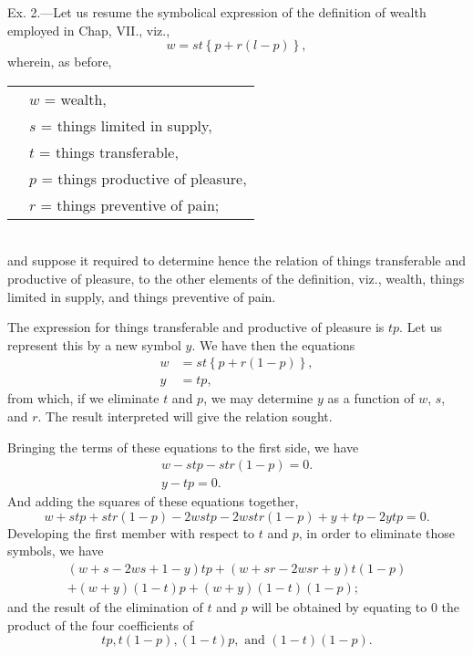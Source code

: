 \documentclass[oneside]{book}
\begin{document}
Ex. 2.---Let us resume the symbolical expression of the definition
of wealth employed in Chap, VII., viz.,
\[
w = st \left\{p + r\left(l - p\right)\right\},
\]
wherein, as before, \\
\begin{tabular}{c l}
&$w$ = \textrm{wealth,}\\
&$s$ = \textrm{things limited in supply,}\\
&$t$ = \textrm{things transferable,}\\
&$p$ = \textrm{things productive of pleasure,}\\
&$r$ = \textrm{things preventive of pain;}
\end{tabular}\\
and suppose it required to determine hence the relation of things
transferable and productive of pleasure, to the other elements of
the definition, viz., wealth, things limited in supply, and things
preventive of pain.

The expression for things transferable and productive of pleasure
is $tp$. Let us represent this by a new symbol $y$. We have
then the equations
\begin{eqnarray*}
w &= st\left\{p + r\left(1-p\right)\right\},\\
y &= tp,
\end{eqnarray*}
from which, if we eliminate $t$ and $p$, we may determine $y$ as a
function of $w$, $s$, and $r$. The result interpreted will give the relation
sought.

Bringing the terms of these equations to the first side, we
have %
\setcounter{equation}{2}
\begin{eqnarray}
w - stp - str \left(1 - p\right) = 0.\nonumber\\
y - tp = 0.
\end{eqnarray}
And adding the squares of these equations together,
\begin{equation}
w + stp + str \left(1-p\right) - 2wstp - 2wstr\left(1-p\right) + y + tp - 2ytp = 0.
\end{equation}
Developing the first member with respect to $t$ and $p$, in order to
eliminate those symbols, we have
\begin{eqnarray}
\left(w+s-2ws+1-y\right)tp + \left(w+sr-2wsr+y\right)t\left(1-p\right)\nonumber\\
+\left(w+y\right)\left(1-t\right)p+\left(w+y\right)\left(1-t\right)\left(1-p\right);
\end{eqnarray}
and the result of the elimination of $t$ and $p$ will be obtained by
equating to $0$ the product of the four coefficients of
\[
tp, t\left(1-p\right), \left(1-t\right)p,\textrm{ and } \left(1-t\right)\left(1-p\right).
\]
\end{document}
